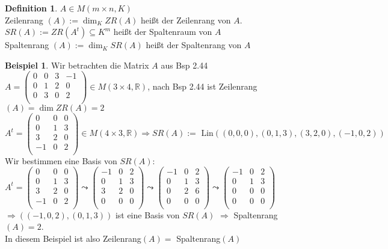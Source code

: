 \documentclass[10pt,a4paper,numbers=endperiod]{scrartcl}
\theoremstyle{definition}
\newtheorem{defi}[satz]{Definition}
\newtheorem{bsp}[satz]{Beispiel}
\def\RR{{\mathbb R}}
\begin{document}
\begin{defi}
	$A \in M(m \times n, K)$\\
	Zeilenrang $(A):= \dim_K ZR(A)$ heißt der Zeilenrang von $A$.\\
	$SR(A) := ZR(A^t) \subseteq K^m$ heißt der Spaltenraum von $A$\\
	Spaltenrang $(A) := \dim_K SR(A)$ heißt der Spaltenrang von $A$
\end{defi}
\newpage
\begin{bsp}
	Wir betrachten die Matrix $A$ aus Bsp 2.44\\
	$A= \begin{pmatrix}
	0&0&3&-1\\
	0&1&2&0\\
	0&3&0&2\\
	\end{pmatrix} \in M(3 \times 4, \RR)$, nach Bsp 2.44 ist Zeilenrang$(A) = \dim ZR(A) = 2$\\
	
	$A^t = \begin{pmatrix}
		0&0&0\\
		0&1&3\\
		3&2&0\\
		-1&0&2\\
	\end{pmatrix} \in M(4 \times 3, \RR) \Rightarrow SR(A) := \text{ Lin}((0,0,0),(0,1,3),(3,2,0),(-1,0,2))$\\
	
	Wir bestimmen eine Basis von $SR(A)$:\\
	
	$A^t = \begin{pmatrix}
	0&0&0\\
	0&1&3\\
	3&2&0\\
	-1&0&2\\
	\end{pmatrix}
	\leadsto
	\begin{pmatrix}
		-1&0&2\\
		0&1&3\\
		3&2&0\\
		0&0&0\\
	\end{pmatrix}
	\leadsto
	\begin{pmatrix}
	-1&0&2\\
	0&1&3\\
	0&2&6\\
	0&0&0\\
	\end{pmatrix}
	\leadsto
	\begin{pmatrix}
	-1&0&2\\
	0&1&3\\
	0&0&0\\
	0&0&0\\
	\end{pmatrix}$\\
	
	$\Rightarrow ((-1,0,2),(0,1,3))$ ist eine Basis von $SR(A)$ $\Rightarrow$ Spaltenrang$(A) =2$.\\
	In diesem Beispiel ist also Zeilenrang$(A)=$ Spaltenrang$(A)$\\
\end{bsp}
\end{document}
